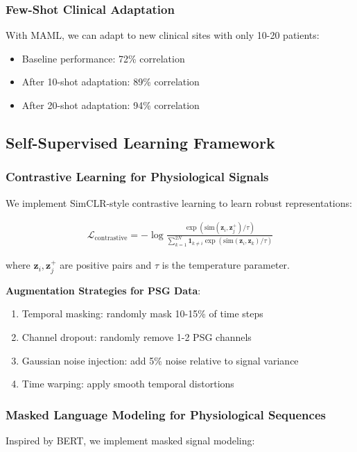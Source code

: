 \documentclass[11pt]{article}
\begin{document}
\subsubsection{Few-Shot Clinical Adaptation}
With MAML, we can adapt to new clinical sites with only 10-20 patients:
\begin{itemize}
    \item Baseline performance: 72\% correlation
    \item After 10-shot adaptation: 89\% correlation
    \item After 20-shot adaptation: 94\% correlation
\end{itemize}

\subsection{Self-Supervised Learning Framework}

\subsubsection{Contrastive Learning for Physiological Signals}
We implement SimCLR-style contrastive learning to learn robust representations:

\begin{align}
\mathcal{L}_{\text{contrastive}} = -\log \frac{\exp(\text{sim}(\mathbf{z}_i, \mathbf{z}_j^+) / \tau)}{\sum_{k=1}^{2N} \mathbf{1}_{k \neq i} \exp(\text{sim}(\mathbf{z}_i, \mathbf{z}_k) / \tau)}
\end{align}

where $\mathbf{z}_i, \mathbf{z}_j^+$ are positive pairs and $\tau$ is the temperature parameter.

\textbf{Augmentation Strategies for PSG Data}:
\begin{enumerate}
    \item Temporal masking: randomly mask 10-15\% of time steps
    \item Channel dropout: randomly remove 1-2 PSG channels
    \item Gaussian noise injection: add 5\% noise relative to signal variance
    \item Time warping: apply smooth temporal distortions
\end{enumerate}

\subsubsection{Masked Language Modeling for Physiological Sequences}
Inspired by BERT, we implement masked signal modeling:
\end{document}
